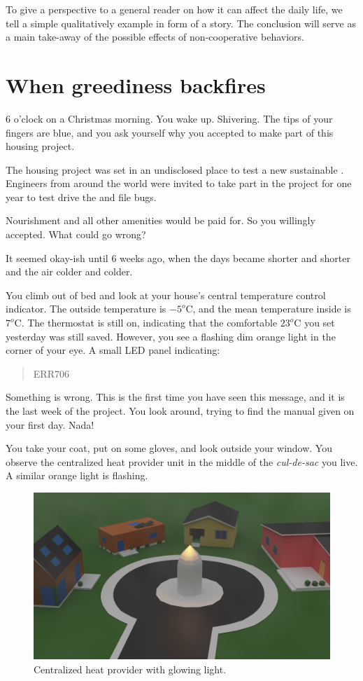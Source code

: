 \documentclass[../main.tex]{subfiles}
\begin{document}
To give a perspective to a general reader on how it can affect the daily life, we tell a simple qualitatively example in form of a story. The conclusion will serve as a main take-away of the possible effects of non-cooperative behaviors.
\newpage
\section{When greediness backfires}
6 o'clock on a Christmas morning.
You wake up.
Shivering.
The tips of your fingers are blue, and you ask yourself why you accepted to make part of this housing project.

The housing project was set in an undisclosed place to test a new sustainable \dhn{}.
Engineers from around the world were invited to take part in the project for one year to test drive the \dhn{} and file bugs.

Nourishment and all other amenities would be paid for.
So you willingly accepted.
What could go wrong?

It seemed okay-ish until $6$ weeks ago, when the days became shorter and shorter and the air colder and colder.

You climb out of bed and look at your house's central temperature control indicator. The outside temperature is $-5^{o}$C, and the mean temperature inside is $7^{o}$C.
The thermostat is still on, indicating that the comfortable $23^{o}$C you set yesterday was still saved. However, you see a flashing dim orange light in the corner of your eye. A small LED panel indicating:
\begin{quote}
ERR706
\end{quote}

Something is wrong.
This is the first time you have seen this message, and it is the last week of the project.
You look around, trying to find the manual given on your first day. Nada!

You take your coat, put on some gloves, and look outside your window.
You observe the centralized heat provider unit in the middle of the \emph{cul-de-sac} you live.
A similar orange light is flashing.
\begin{figure}[H]
  \centering
  \includegraphics[width=.75\textwidth]{../img/district_3d_cycles_lights2.png}
  \caption{Centralized heat provider with glowing light.}\label{fig:culdesac}
\end{figure}
\end{document}
